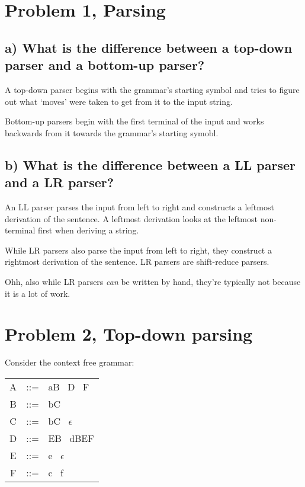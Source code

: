 \section{Problem 1, Parsing}
\subsection{a) What is the difference between a top-down parser and a bottom-up parser?}
A top-down parser begins with the grammar's starting symbol and tries to figure out what `moves' were taken to get from it to the input string.

Bottom-up parsers begin with the first terminal of the input and works backwards from it towards the grammar's starting symobl.


\subsection{b) What is the difference between a LL parser and a LR parser?}

An LL parser parses the input from left to right and constructs a leftmost derivation of the sentence.
A leftmost derivation looks at the leftmost non-terminal first when deriving a string.

While LR parsers also parse the input from left to right, they construct a rightmost derivation of the sentence.
LR parsers are shift-reduce parsers.

Ohh, also while LR parsers \textit{can} be written by hand, they're typically not because it is a lot of work.


\section{Problem 2, Top-down parsing}
Consider the context free grammar:
\begin{table}[H]
\begin{tabular}{ccl}
	A	& ::=	& aB \textbar ~D \textbar  ~F \\
	B 	& ::=	& bC \\
	C 	& ::=	& bC \textbar ~$\epsilon$ \\
	D  	& ::=	& EB \textbar ~dBEF \\
	E 	& ::=	& e \textbar ~$\epsilon$ \\
	F 	& ::=	& c \textbar ~f 
\end{tabular}
\end{table}

